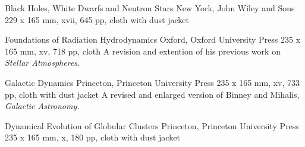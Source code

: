 {Black Holes, White Dwarfs and Neutron Stars}
{New York, John Wiley and Sons}
{229 x 165 mm, xvii, 645 pp, cloth with dust jacket}
{}

{Foundations of Radiation Hydrodynamics}
{Oxford, Oxford University Press}
{235 x 165 mm, xv, 718 pp, cloth}
{}
A revision and extention of his previous work on {\it Stellar Atmospheres.}

{Galactic Dynamics}
{Princeton, Princeton University Press}
{235 x 165 mm, xv, 733 pp, cloth with dust jacket}
{}
A revised and enlarged version of Binney and Mihalis, {\it Galactic Astronomy.}

{Dynamical Evolution of Globular Clusters}
{Princeton, Princeton University Press}
{235 x 165 mm, x, 180 pp, cloth with dust jacket}
{}

